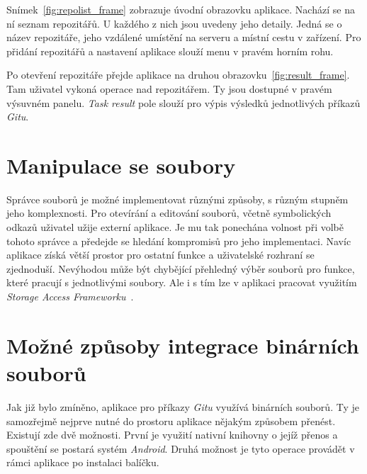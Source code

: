Snímek~\ref{fig:repolist_frame} zobrazuje úvodní obrazovku aplikace. Nachází se na ní seznam repozitářů. U každého z nich jsou uvedeny jeho detaily. Jedná se o název repozitáře, jeho vzdálené umístění na serveru a místní cestu v zařízení. Pro přidání repozitářů a nastavení aplikace slouží menu v pravém horním rohu. 

Po otevření repozitáře přejde aplikace na druhou obrazovku~\ref{fig:result_frame}. Tam uživatel vykoná operace nad repozitářem. Ty jsou dostupné v pravém výsuvném panelu. \emph{Task result} pole slouží pro výpis výsledků jednotlivých příkazů \emph{Gitu}.

\section{Manipulace se soubory}
Správce souborů je možné implementovat různými způsoby, s různým stupněm jeho komplexnosti. Pro otevírání a editování souborů, včetně symbolických odkazů uživatel užije externí aplikace. Je mu tak ponechána volnost při volbě tohoto správce a předejde se hledání kompromisů pro jeho implementaci. Navíc aplikace získá větší prostor pro ostatní funkce a uživatelské rozhraní se zjednoduší. Nevýhodou může být chybějící přehledný výběr souborů pro funkce, které pracují s jednotlivými soubory. Ale i s tím lze v aplikaci pracovat využitím \emph{Storage Access Frameworku}~.

\section{Možné způsoby integrace binárních souborů}
Jak již bylo zmíněno, aplikace pro příkazy \emph{Gitu} využívá binárních souborů. Ty je samozřejmě nejprve nutné do prostoru aplikace nějakým způsobem přenést. Existují zde dvě možnosti. První je využití nativní knihovny o jejíž přenos a spouštění se postará systém \emph{Android}. Druhá možnost je tyto operace provádět v rámci aplikace po instalaci balíčku.

